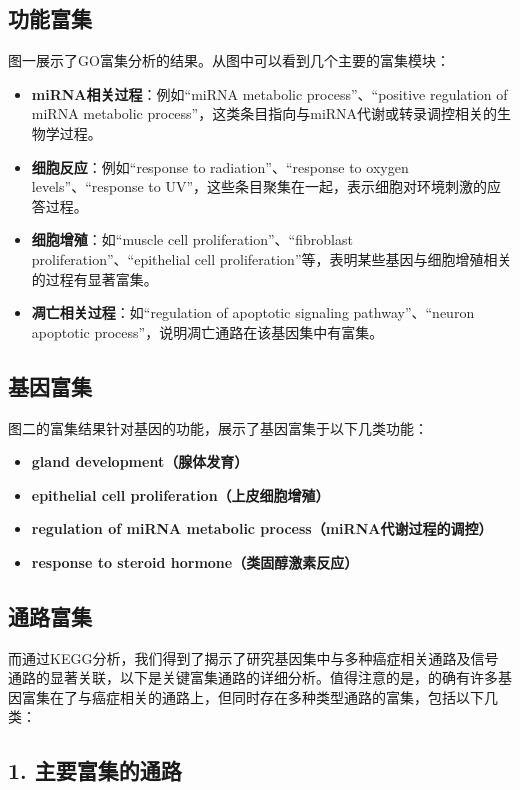 \documentclass{article}
\begin{document}
\subsection*{功能富集}
图一展示了GO富集分析的结果。从图中可以看到几个主要的富集模块：
\begin{itemize}
\item \textbf{miRNA相关过程}：例如“miRNA metabolic process”、“positive regulation of miRNA metabolic process”，这类条目指向与miRNA代谢或转录调控相关的生物学过程。
\item \textbf{细胞反应}：例如“response to radiation”、“response to oxygen levels”、“response to UV”，这些条目聚集在一起，表示细胞对环境刺激的应答过程。
\item \textbf{细胞增殖}：如“muscle cell proliferation”、“fibroblast proliferation”、“epithelial cell proliferation”等，表明某些基因与细胞增殖相关的过程有显著富集。
\item \textbf{凋亡相关过程}：如“regulation of apoptotic signaling pathway”、“neuron apoptotic process”，说明凋亡通路在该基因集中有富集。
\end{itemize}

\subsection*{基因富集}
图二的富集结果针对基因的功能，展示了基因富集于以下几类功能：
\begin{itemize}
\item\textbf{gland development（腺体发育）}
\item\textbf{epithelial cell proliferation（上皮细胞增殖）}
\item\textbf{regulation of miRNA metabolic process（miRNA代谢过程的调控）}
\item\textbf{response to steroid hormone（类固醇激素反应）}
\end{itemize}

\subsection*{通路富集}
而通过KEGG分析，我们得到了揭示了研究基因集中与多种癌症相关通路及信号通路的显著关联，以下是关键富集通路的详细分析。值得注意的是，的确有许多基因富集在了与癌症相关的通路上，但同时存在多种类型通路的富集，包括以下几类：

\subsection*{1. 主要富集的通路}
\end{document}
